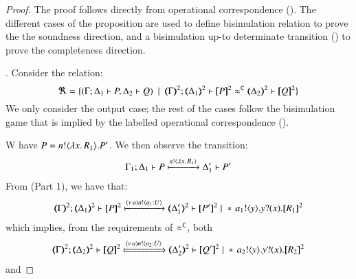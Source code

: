 \begin{proof}

%
	The proof follows directly from operational correspondence ().
	The different cases of the proposition are used to define
	bisimulation relation to prove the the soundness direction, and
	a bisimulation up-to determinate transition
	()
	to prove the
	completeness direction.

\bigskip

	. Consider the relation:
	\[
		\Re = \set{(\horel{\Gamma}{\Delta_1}{P}{,}{\Delta_2}{Q}) \setbar \horel{\mapt{\Gamma}^{2}}{\mapt{\Delta_1}^2}{\pmap{P}{2}}{\fwb}{\mapt{\Delta_2}^2}{\pmap{Q}{2}}}
	\]
%
	We only consider the output case; the rest of the cases follow
	the bisimulation game that is implied by the labelled operational correspondence ().

	\noi W have $P = n ! \langle \lambda x.\,R_1 \rangle . P'$. We then observe the transition:
%
	\begin{eqnarray*}
		\Gamma_1; \Delta_1 \vdash P \xmapsto{n !\langle \lambda x.\,R_1 \rangle} \Delta_1' \vdash P'
	\end{eqnarray*}
%
	From   (Part 1), we have that:
%
	\begin{eqnarray*}
		\mapt{\Gamma}^{2}; \mapt{\Delta_1}^{2} \proves \pmap{P}{2} \hby{\news{a} \bactout{n}{a_1: U}} \mapt{\Delta_1'}^{2} \proves \pmap{P'}{2} \Par \repl \bout{a_1}{y} \binp{y}{x} \pmap{R_1}{2}
	\end{eqnarray*}
%
	which implies, from the requirements of $\approx^\mathtt{C}$, both 
%
	\begin{eqnarray}
		\label{prop:fa_ho_sessp_1}
		\mapt{\Gamma}^{2}; \mapt{\Delta_2}^{2} \proves \pmap{Q}{2} \Hby{\news{a} \bactout{n}{a_2: U}} \mapt{\Delta_2'}^{2} \proves \pmap{Q'}{2} \Par \repl \bout{a_2}{y} \binp{y}{x} \pmap{R_2}{2}
	\end{eqnarray}
%
	and


\end{proof}
